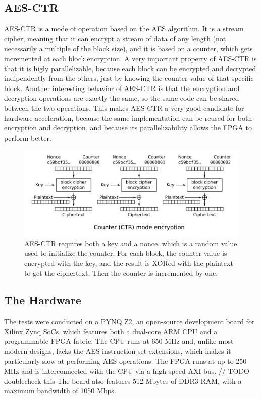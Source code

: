 \documentclass[12pt,oneside,a4paper]{article}
\begin{document}
\subsection{AES-CTR} \label{subsec:aes-ctr}
AES-CTR is a mode of operation based on the AES algorithm. It is a stream cipher, meaning that it can encrypt a stream of data of any length (not necessarily a multiple of the block size), and it is based on a counter, which gets incremented at each block encryption.
A very important property of AES-CTR is that it is higly parallelizable, because each block can be encrypted and decrypted indipendently from the others, just by knowing the counter value of that specific block.
Another interesting behavior of AES-CTR is that the encryption and decryption operations are exactly the same, so the same code can be shared between the two operations.
This makes AES-CTR a very good candidate for hardware acceleration, because the same implementation can be reused for both encryption and decryption, and because its parallelizability allows the FPGA to perform better.
\begin{figure}
	\centering
	\includegraphics[width=\textwidth]{CTR_encryption_scheme.png}
	\caption{AES-CTR requires both a key and a nonce, which is a random value used to initialize the counter. For each block, the counter value is encrypted with the key, and the result is XORed with the plaintext to get the ciphertext. Then the counter is incremented by one.}
\end{figure}

\subsection{The Hardware} \label{subsec:the-hardware}
The tests were conducted on a PYNQ Z2, an open-source development board for Xilinx Zynq SoCs, which features both a dual-core ARM CPU and a programmable FPGA fabric.
The CPU runs at 650 MHz and, unlike most modern designs, lacks the AES instruction set extensions, which makes it particularly slow at performing AES operations.
The FPGA runs at up to 250 MHz and is interconnected with the CPU via a high-speed AXI bus. // TODO doublecheck this
The board also features 512 Mbytes of DDR3 RAM, with a maximum bandwidth of 1050 Mbps.
\end{document}
